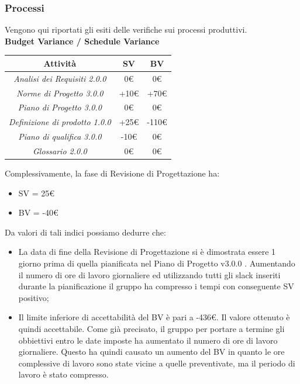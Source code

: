 {\begin{itemize}
\end{itemize}
\subsubsection{Processi}

Vengono qui riportati gli esiti delle verifiche sui processi produttivi.\\


\textbf{Budget Variance / Schedule Variance}

\begin{center}
\begin{tabular}{|c|c|c|}

\hline
\textbf{Attività} & \textbf{SV} & \textbf{BV} \\
\hline
\emph{Analisi dei Requisiti 2.0.0} & 0€ & 0€ \\
\hline
\emph{Norme di Progetto 3.0.0} & +10€ & +70€ \\
\hline
\emph{Piano di Progetto 3.0.0} & 0€ & 0€ \\
\hline
\emph{Definizione di prodotto 1.0.0} & +25€ & -110€ \\
\hline
\emph{Piano di qualifica 3.0.0} & -10€ & 0€ \\
\hline
\emph{Glossario 2.0.0} & 0€ & 0€ \\
\hline
\end{tabular}
\end{center}

Complessivamente, la fase di Revisione di Progettazione ha:
\begin{itemize}
\item SV = 25€
\item BV = -40€
\end{itemize}

Da valori di tali indici possiamo dedurre che:
\begin{itemize}
\item La data di fine della Revisione di Progettazione si è dimostrata essere 1
giorno prima di quella pianificata nel Piano di Progetto v3.0.0 .
Aumentando il numero di ore di lavoro giornaliere ed utilizzando tutti gli slack
inseriti durante la pianificazione il gruppo ha compresso i tempi con conseguente
SV positivo;
\item  Il limite inferiore di accettabilità del BV è pari a -436€.
Il valore ottenuto è quindi accettabile. Come già precisato, il gruppo per portare a termine gli obbiettivi entro le date imposte ha aumentato il numero di ore di lavoro giornaliere.
Questo ha quindi causato un aumento del BV in quanto le ore complessive di
lavoro sono state vicine a quelle preventivate, ma il periodo di lavoro è stato
compresso.
\end{itemize}


}
